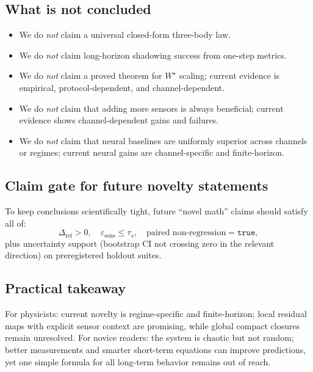 \documentclass[11pt]{article}
\begin{document}
\subsection*{What is not concluded}
\begin{itemize}
\item We do \emph{not} claim a universal closed-form three-body law.
\item We do \emph{not} claim long-horizon shadowing success from one-step metrics.
\item We do \emph{not} claim a proved theorem for $W^\star$ scaling; current evidence is empirical, protocol-dependent, and channel-dependent.
\item We do \emph{not} claim that adding more sensors is always beneficial; current evidence shows channel-dependent gains and failures.
\item We do \emph{not} claim that neural baselines are uniformly superior across channels or regimes; current neural gains are channel-specific and finite-horizon.
\end{itemize}

\subsection*{Claim gate for future novelty statements}
To keep conclusions scientifically tight, future ``novel math'' claims should satisfy all of:
\[
\Delta_{\mathrm{rel}}>0,\quad \varepsilon_{\mathrm{sens}}\le\tau_s,\quad \text{paired non-regression}= \texttt{true},
\]
plus uncertainty support (bootstrap CI not crossing zero in the relevant direction) on preregistered holdout suites.

\subsection*{Practical takeaway}
For physicists: current novelty is regime-specific and finite-horizon; local residual maps with explicit sensor context are promising, while global compact closures remain unresolved. For novice readers: the system is chaotic but not random; better measurements and smarter short-term equations can improve predictions, yet one simple formula for all long-term behavior remains out of reach.
\end{document}
